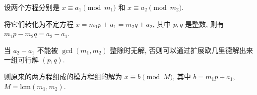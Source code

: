 设两个方程分别是 $x\equiv a_1 \pmod {m_1}$ 和 $x\equiv a_2 \pmod {m_2}$.

将它们转化为不定方程 $x=m_1p+a_1=m_2q+a_2$, 其中 $p, q$ 是整数, 则有 $m_1p-m_2q=a_2-a_1$.

当 $a_2-a_1$ 不能被 $\gcd(m_1,m_2)$ 整除时无解, 否则可以通过扩展欧几里德解出来一组可行解 $(p, q)$.

则原来的两方程组成的模方程组的解为 $x\equiv b\pmod M$, 其中 $b=m_1p+a_1$, $M=\text{lcm}(m_1, m_2)$.